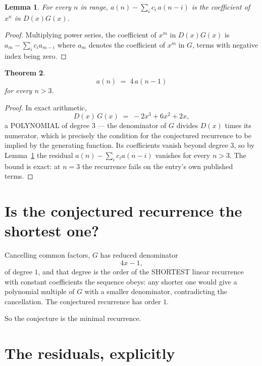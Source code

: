 \documentclass[11pt,a4paper]{article}
\theoremstyle{plain}
\newtheorem{theorem}{Theorem}
\newtheorem{lemma}[theorem]{Lemma}
\theoremstyle{definition}
\begin{document}
\begin{lemma}\label{lem:key}
For every $n$ in range, $a(n)-\sum_i c_i\,a(n-i)$ is the coefficient of $x^{n}$ in
$D(x)G(x)$.
\end{lemma}

\begin{proof}
Multiplying power series, the coefficient of $x^{m}$ in $D(x)G(x)$ is
$a_m-\sum_i c_i a_{m-i}$ where $a_m$ denotes the coefficient of $x^{m}$ in $G$, terms with
negative index being zero.
\end{proof}

\begin{theorem}
\[
a(n)\;=\;4\,a(n-1)
\]
for every $n>3$.
\end{theorem}

\begin{proof}
In exact arithmetic,
\[
D(x)\,G(x)\;=\;- 2 x^{3} + 6 x^{2} + 2 x,
\]
a POLYNOMIAL of degree $3$ --- the denominator of $G$ divides $D(x)$ times its numerator,
which is precisely the condition for the conjectured recurrence to be implied by the
generating function. Its coefficients vanish beyond degree $3$, so by
Lemma~\ref{lem:key} the residual $a(n)-\sum_ic_ia(n-i)$ vanishes for every
$n>3$. The bound is exact: at $n=3$ the recurrence fails on the entry's own published terms.
\end{proof}

\section{Is the conjectured recurrence the shortest one?}

Cancelling common factors, $G$ has reduced denominator
\[
4 x - 1,
\]
of degree $1$, and that degree is the order of the SHORTEST linear recurrence with
constant coefficients the sequence obeys: any shorter one would give a polynomial multiple of
$G$ with a smaller denominator, contradicting the cancellation. The conjectured recurrence has
order $1$.

So the conjecture is the minimal recurrence.

\section{The residuals, explicitly}
\end{document}
